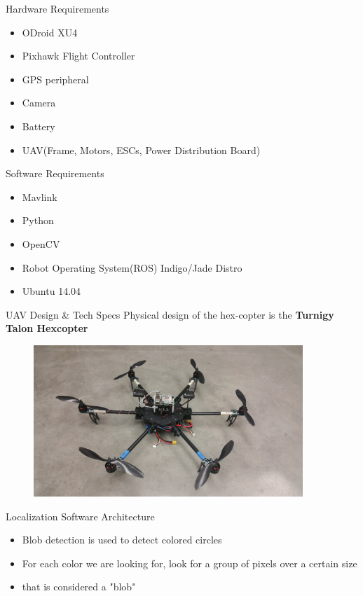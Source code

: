 \documentclass[11pt]{beamer}
\begin{document}
\begin{frame}{Hardware Requirements}
\begin{itemize}
\item ODroid XU4
\item Pixhawk Flight Controller
\item GPS peripheral
\item Camera
\item Battery
\item UAV(Frame, Motors, ESCs, Power Distribution Board)
\end{itemize}

\end{frame}

\begin{frame}{Software Requirements}
\begin{itemize}
\item Mavlink
\item Python
\item OpenCV
\item Robot Operating System(ROS) Indigo/Jade Distro
\item Ubuntu 14.04
\end{itemize}

\end{frame}



\begin{frame}{UAV Design \& Tech Specs}
	Physical design of the hex-copter is the \textbf{Turnigy Talon Hexcopter}
	
	\begin{figure}
		\includegraphics[width=4in]{images/TalonV1.jpg}
	\end{figure}

\end{frame}

\begin{frame}{Localization Software Architecture}
	\begin{itemize}
		\item Blob detection is used to detect colored circles
		\item For each color we are looking for, look for a group of pixels over a certain size
		\item that is considered a "blob"
	\end{itemize}
\end{frame}
\end{document}
